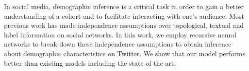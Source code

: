 In social media, demographic inference is a critical task in order to gain a better understanding of a cohort and to facilitate interacting with one's audience. Most previous work has made independence assumptions over topological, textual and label information on social networks. In this work, we employ recursive neural networks to break down these independence assumptions to obtain inference about demographic characteristics on Twitter. We show that our model performs better than existing models including the state-of-the-art.
